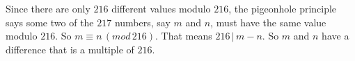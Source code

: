 \begin{Solution}
 Since
there are only $216$ different values modulo $216$, the pigeonhole principle says
some two of the $217$ numbers, say $m$ and $n$, must have the same value modulo 
$216$. So $m\equiv n\,(mod\,216)$. That means $216\,|\,m-n$. So $m$ and $n$ have 
a difference that is a multiple of $216$.
\end{Solution}
